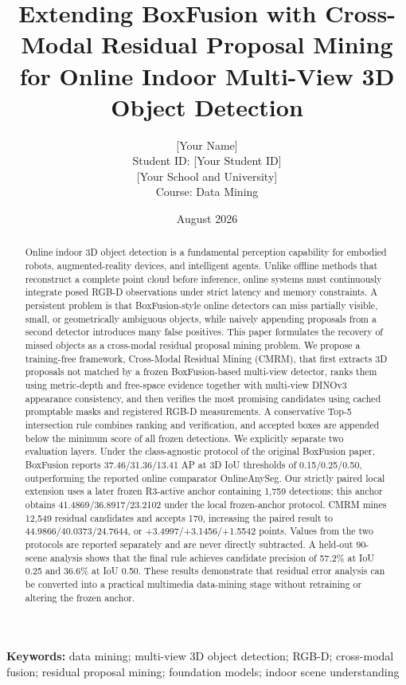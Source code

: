 \documentclass[11pt,a4paper]{article}
\title{\textbf{Extending BoxFusion with Cross-Modal Residual Proposal Mining\\for Online Indoor Multi-View 3D Object Detection}}
\author{[Your Name]\\
\small Student ID: [Your Student ID]\\
\small [Your School and University]\\
\small Course: Data Mining}
\date{August 2026}
\begin{document}
\maketitle

\begin{abstract}
Online indoor 3D object detection is a fundamental perception capability for embodied robots, augmented-reality devices, and intelligent agents. Unlike offline methods that reconstruct a complete point cloud before inference, online systems must continuously integrate posed RGB-D observations under strict latency and memory constraints. A persistent problem is that BoxFusion-style online detectors can miss partially visible, small, or geometrically ambiguous objects, while naively appending proposals from a second detector introduces many false positives. This paper formulates the recovery of missed objects as a cross-modal residual proposal mining problem. We propose a training-free framework, Cross-Modal Residual Mining (CMRM), that first extracts 3D proposals not matched by a frozen BoxFusion-based multi-view detector, ranks them using metric-depth and free-space evidence together with multi-view DINOv3 appearance consistency, and then verifies the most promising candidates using cached promptable masks and registered RGB-D measurements. A conservative Top-5 intersection rule combines ranking and verification, and accepted boxes are appended below the minimum score of all frozen detections. We explicitly separate two evaluation layers. Under the class-agnostic protocol of the original BoxFusion paper, BoxFusion reports 37.46/31.36/13.41 AP at 3D IoU thresholds of 0.15/0.25/0.50, outperforming the reported online comparator OnlineAnySeg. Our strictly paired local extension uses a later frozen R3-active anchor containing 1,759 detections; this anchor obtains 41.4869/36.8917/23.2102 under the local frozen-anchor protocol. CMRM mines 12,549 residual candidates and accepts 170, increasing the paired result to 44.9866/40.0373/24.7644, or +3.4997/+3.1456/+1.5542 points. Values from the two protocols are reported separately and are never directly subtracted. A held-out 90-scene analysis shows that the final rule achieves candidate precision of 57.2\% at IoU 0.25 and 36.6\% at IoU 0.50. These results demonstrate that residual error analysis can be converted into a practical multimedia data-mining stage without retraining or altering the frozen anchor.

\end{abstract}
\noindent\textbf{Keywords:} data mining; multi-view 3D object detection; RGB-D; cross-modal fusion; residual proposal mining; foundation models; indoor scene understanding
\end{document}
